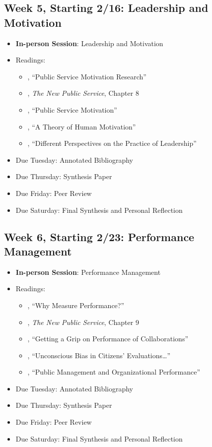 \documentclass[12pt, letterpaper]{article}
\begin{document}
\subsection*{Week 5, Starting 2/16: Leadership and Motivation}
\begin{itemize}
    \item \textbf{In-person Session}: Leadership and Motivation
    \item Readings:
        \begin{itemize}
            \item \citet{Christensen2017}, ``Public Service Motivation Research'' 
            \item \citet{Denhardt2015}, \emph{The New Public Service}, Chapter 8 
            \item \citet{Lachance2017}, ``Public Service Motivation'' 
            \item \citet{maslow1943}, ``A Theory of Human Motivation'' 
            \item \citet{Fairholm2004}, ``Different Perspectives on the Practice of Leadership'' 
        \end{itemize}
    \item Due Tuesday: Annotated Bibliography
    \item Due Thursday: Synthesis Paper
    \item Due Friday: Peer Review
    \item Due Saturday: Final Synthesis and Personal Reflection
\end{itemize}

\subsection*{Week 6, Starting 2/23: Performance Management}
\begin{itemize}
    \item \textbf{In-person Session}: Performance Management
    \item Readings:
        \begin{itemize}
            \item \citet{Behn2003}, ``Why Measure Performance?'' 
            \item \citet{Denhardt2015}, \emph{The New Public Service}, Chapter 9 
            \item \citet{douglas2021}, ``Getting a Grip on Performance of Collaborations'' 
            \item \citet{marvel2015}, ``Unconscious Bias in Citizens' Evaluations\dots'' 
            \item \citet{nicholson-crotty2004}, ``Public Management and Organizational Performance'' 
        \end{itemize}
    \item Due Tuesday: Annotated Bibliography
    \item Due Thursday: Synthesis Paper
    \item Due Friday: Peer Review
    \item Due Saturday: Final Synthesis and Personal Reflection
\end{itemize}
\end{document}
